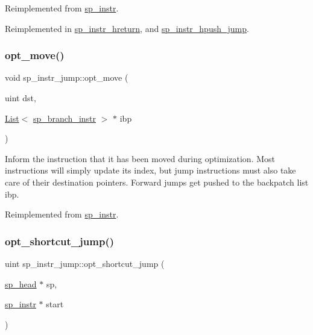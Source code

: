 Reimplemented from \mbox{\hyperlink{classsp__instr_a10b7b33a30316fca4cff5adfe98e282c}{sp\+\_\+instr}}.



Reimplemented in \mbox{\hyperlink{classsp__instr__hreturn_a2154f9d995bbd7aa47b0fe714ef3c33f}{sp\+\_\+instr\+\_\+hreturn}}, and \mbox{\hyperlink{classsp__instr__hpush__jump_affb8b5892ac7dd82bcbb99183f6bc6e3}{sp\+\_\+instr\+\_\+hpush\+\_\+jump}}.

\mbox{\label{classsp__instr__jump_a84478dd9ceeedc8693c60d77d24816f7}} 
\subsubsection{\texorpdfstring{opt\+\_\+move()}{opt\_move()}}
{\footnotesize\ttfamily void sp\+\_\+instr\+\_\+jump\+::opt\+\_\+move (\begin{DoxyParamCaption}\item[{uint}]{dst,  }\item[{\mbox{\hyperlink{classList}{List}}$<$ \mbox{\hyperlink{classsp__branch__instr}{sp\+\_\+branch\+\_\+instr}} $>$ $\ast$}]{ibp }\end{DoxyParamCaption})\hspace{0.3cm}{\ttfamily [virtual]}}

Inform the instruction that it has been moved during optimization. Most instructions will simply update its index, but jump instructions must also take care of their destination pointers. Forward jumps get pushed to the backpatch list \textquotesingle{}ibp\textquotesingle{}. 

Reimplemented from \mbox{\hyperlink{classsp__instr_a7b73990576fc8cd3f4a8bd16003ab44b}{sp\+\_\+instr}}.

\mbox{\label{classsp__instr__jump_a7c0f595bd9f39e9b38cc1e06333c3db0}} 
\subsubsection{\texorpdfstring{opt\+\_\+shortcut\+\_\+jump()}{opt\_shortcut\_jump()}}
{\footnotesize\ttfamily uint sp\+\_\+instr\+\_\+jump\+::opt\+\_\+shortcut\+\_\+jump (\begin{DoxyParamCaption}\item[{\mbox{\hyperlink{classsp__head}{sp\+\_\+head}} $\ast$}]{sp,  }\item[{\mbox{\hyperlink{classsp__instr}{sp\+\_\+instr}} $\ast$}]{start }\end{DoxyParamCaption})\hspace{0.3cm}{\ttfamily [virtual]}}

